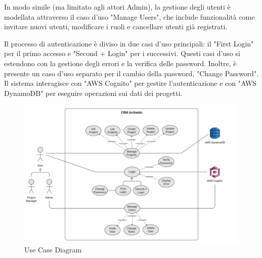 \documentclass[target=bach,aauheader=,style=]{thud}
\begin{document}
\noindent In modo simile (ma limitato agli attori Admin), la gestione degli utenti è modellata attraverso il caso d'uso "Manage Users", che include funzionalità come invitare nuovi utenti, modificare i ruoli e cancellare utenti già registrati. 

\noindent Il processo di autenticazione è diviso in due casi d'uso principali: il "First Login" per il primo accesso e "Second + Login" per i successivi. Questi casi d'uso si estendono con la gestione degli errori e la verifica delle password. Inoltre, è presente un caso d'uso separato per il cambio della password, "Change Password". Il sistema interagisce con "AWS Cognito" per gestire l'autenticazione e con "AWS DynamoDB" per eseguire operazioni sui dati dei progetti.

\begin{figure}[H]
    \centering
    \includegraphics[width=1\textwidth]{img/diagrammi/use_case.pdf} 
    \caption{Use Case Diagram}
\end{figure}
\end{document}

